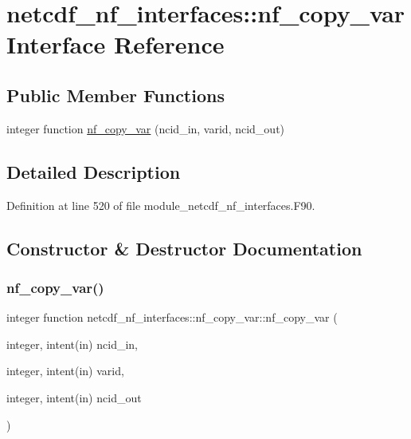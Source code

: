 \hypertarget{interfacenetcdf__nf__interfaces_1_1nf__copy__var}{}\section{netcdf\+\_\+nf\+\_\+interfaces\+:\+:nf\+\_\+copy\+\_\+var Interface Reference}
\label{interfacenetcdf__nf__interfaces_1_1nf__copy__var}
\subsection*{Public Member Functions}
\begin{DoxyCompactItemize}
\item 
integer function \hyperlink{interfacenetcdf__nf__interfaces_1_1nf__copy__var_acb8d3108de8648bbaa6314ae4e20dd09}{nf\+\_\+copy\+\_\+var} (ncid\+\_\+in, varid, ncid\+\_\+out)
\end{DoxyCompactItemize}


\subsection{Detailed Description}


Definition at line 520 of file module\+\_\+netcdf\+\_\+nf\+\_\+interfaces.\+F90.



\subsection{Constructor \& Destructor Documentation}
\mbox{\label{interfacenetcdf__nf__interfaces_1_1nf__copy__var_acb8d3108de8648bbaa6314ae4e20dd09}} 
\subsubsection{\texorpdfstring{nf\+\_\+copy\+\_\+var()}{nf\_copy\_var()}}
{\footnotesize\ttfamily integer function netcdf\+\_\+nf\+\_\+interfaces\+::nf\+\_\+copy\+\_\+var\+::nf\+\_\+copy\+\_\+var (\begin{DoxyParamCaption}\item[{integer, intent(in)}]{ncid\+\_\+in,  }\item[{integer, intent(in)}]{varid,  }\item[{integer, intent(in)}]{ncid\+\_\+out }\end{DoxyParamCaption})}



